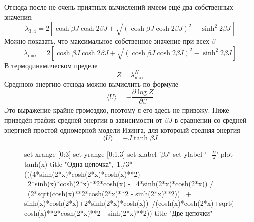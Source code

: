 \documentclass{article}
\begin{document}
		Отсюда после не очень приятных вычислений имеем ещё два собственных значения:
		\begin{equation}
			\lambda_{3,4} = 2\left[ \cosh{\beta J} \cosh{2\beta J} \pm
					\sqrt{(\cosh{\beta J} \cosh{2\beta J})^2 - \sinh^2{2\beta J}}\right]
		\end{equation}
		Можно показать, что максимальное собственное значение при всех $\beta$ --- 
		\begin{equation}
			\lambda_{\mathrm{max}} = 2\left[ \cosh{\beta J} \cosh{2\beta J} +
					\sqrt{(\cosh{\beta J} \cosh{2\beta J})^2 - \sinh^2{2\beta J}}\right]
		\end{equation}
		В термодинамическом пределе 
		\begin{equation}
			Z = \lambda_{\mathrm{max}}^N 
		\end{equation}
		Среднюю энергию отсюда можно вычислить по формуле
		\begin{equation}
			\langle U \rangle = -\frac{\partial \log Z}{\partial \beta}
		\end{equation}
		Это выражение крайне громоздко, поэтому я его здесь не привожу.
		Ниже приведён график средней энергии в зависимости от $\beta J$ в сравнении со
		средней энергией простой одномерной модели Изинга, для 
		котороый средняя энергия --- 
		\begin{equation}
			\langle U \rangle = -J \tanh{\beta J}
		\end{equation}
		\begin{figure}[h]
			\begin{centering}
				\begin{gnuplot}[terminal=epslatex, terminaloptions=color dashed]
					set xrange [0:3]
					set yrange [0:1.3]
					set xlabel '$\beta J$'
					set ylabel '$-\frac{U}{J}$'
					plot	tanh(x) title "Одна цепочка",\
					     1./3*(((4*sinh(2*x)*cosh(2*x)*cosh(x)**2) + \
						2*sinh(x)*cosh(2*x)**2*cosh(x) - \
						4*sinh(2*x)*cosh(2*x)) /  \
						(2*sqrt(cosh(x)**2*cosh(2*x)**2 - sinh(2*x)**2)) \
						+ sinh(x)*cosh(2*x)+2*sinh(2*x)*cosh(x))\
						/(cosh(x)*cosh(2*x)+sqrt(cosh(x)**2*cosh(2*x)**2 - sinh(2*x)**2)) title "Две цепочки"
				\end{gnuplot}
			\end{centering}
		\end{figure}
\end{document}
